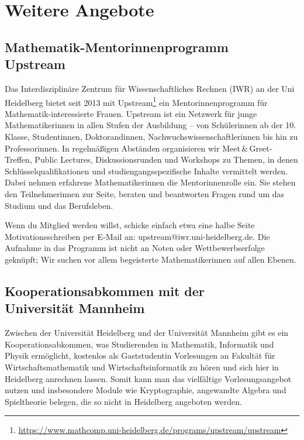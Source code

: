 \section{Weitere Angebote}

\subsection{Mathematik-Mentorinnenprogramm \\Upstream}
Das Interdisziplinäre Zentrum für Wissenschaftliches Rechnen (IWR) an der Uni Heidelberg bietet seit 2013 mit Upstream\footnote{\url{https://www.mathcomp.uni-heidelberg.de/programs/upstream/upstream}} ein Mentorinnenprogramm für Mathematik-interessierte Frauen. Upstream ist ein Netzwerk für junge Mathematikerinnen in allen Stufen der Ausbildung -- von Schülerinnen ab der 10. Klasse, Studentinnen, Doktorandinnen, Nachwuchswissenschaftlerinnen bis hin zu Professorinnen. In regelmäßigen Abständen organisieren wir Meet\,\&\,Greet-Treffen, Public Lectures, Diskussionsrunden und Workshops zu Themen, in denen Schlüsselqualifikationen und studiengangsspezifische Inhalte vermittelt werden. Dabei nehmen erfahrene Mathematikerinnen die Mentorinnenrolle ein. Sie stehen den Teilnehmerinnen zur Seite, beraten und beantworten Fragen rund um das Studium und das Berufsleben.

Wenn du Mitglied werden willst, schicke einfach etwa eine halbe Seite Motivationsschreiben per E-Mail an: upstream@iwr.uni-heidelberg.de. Die Aufnahme in das Programm ist nicht an Noten oder Wettbewerbserfolge geknüpft; Wir suchen vor allem begeisterte Mathematikerinnen auf allen Ebenen.

\subsection{Kooperationsabkommen mit der \\Universität Mannheim}
Zwischen der Universität Heidelberg und der Universität Mannheim gibt es ein Kooperationsabkommen, was Studierenden in Mathematik, Informatik und Physik ermöglicht, kostenlos als Gaststudentin Vorlesungen an Fakultät für Wirtschaftsmathematik und Wirtschaftsinformatik zu hören und sich hier in Heidelberg anrechnen lassen. 
Somit kann man das vielfältige Vorlesungsangebot nutzen und insbesondere Module wie Kryptographie, angewandte Algebra und Spieltheorie belegen, die so nicht in Heidelberg angeboten werden.